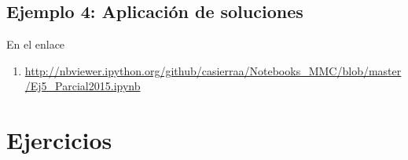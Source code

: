 \documentclass[../notas medios.tex]{subfiles}
\begin{document}
\subsection*{Ejemplo 4: Aplicación de soluciones}
En el enlace

\begin{enumerate} 
\item \small{\url{http://nbviewer.ipython.org/github/casierraa/Notebooks_MMC/blob/master/Ej5_Parcial2015.ipynb}}
\end{enumerate}

\newpage
\section{Ejercicios}

\end{document}
